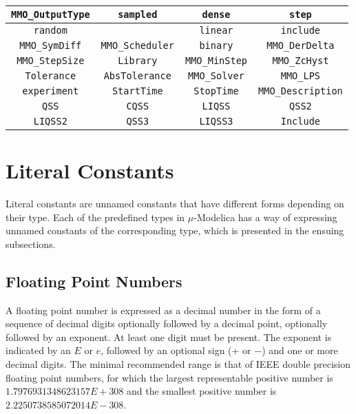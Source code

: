\documentclass[11pt,a4paper,notitlepage]{report}
\begin{document}
\begin{center}
\begin{tabular}{|c|c|c|c|}
	\hline
	\verb"MMO_OutputType" & \verb"sampled" & \verb"dense" & \verb"step"  \\	
	\hline
	\verb"random" & \verb"" & \verb"linear" & \verb"include" \\
	\hline
	\verb"MMO_SymDiff" & \verb"MMO_Scheduler" & \verb"binary" & \verb"MMO_DerDelta" \\
	\hline 	
	\verb"MMO_StepSize" & \verb"Library" & \verb"MMO_MinStep" & \verb"MMO_ZcHyst" \\
	\hline 
	\verb"Tolerance" & \verb"AbsTolerance" & \verb"MMO_Solver" & \verb"MMO_LPS" \\  	 
	\hline	
	\verb"experiment" &  \verb"StartTime" & \verb"StopTime" & \verb"MMO_Description"\\	
	\hline
	\verb"QSS" & \verb"CQSS" & \verb"LIQSS" & \verb"QSS2" \\
	\hline	
	\verb"LIQSS2" & \verb"QSS3" & \verb"LIQSS3" & \verb"Include" \\ 	
	\hline
\end{tabular}
\end{center}

\section{Literal Constants}

Literal constants are unnamed constants that have different forms depending on their type. Each of the predefined types in $\mu$-Modelica has a way of expressing unnamed constants of the corresponding type, which is presented in the ensuing subsections. 

\subsection{Floating Point Numbers}

A floating point number is expressed as a decimal number in the form of a sequence of decimal digits optionally followed by a decimal point, optionally followed by an exponent. At least one digit must be present. The exponent is indicated by an $E$ or $e$, followed by an optional sign ($+$ or $-$) and one or more decimal digits. The minimal recommended range is that of IEEE double precision floating point numbers, for which the largest representable positive number is $1.7976931348623157E+308$ and the smallest positive number is $2.2250738585072014E-308$.
\end{document}
